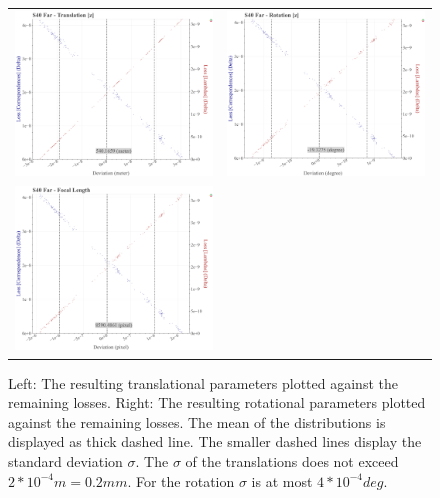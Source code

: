 \begin{figure}[t]
\begin{tabular}{cc}
    \includegraphics[width=0.45 \linewidth]{diagrams/calibration/s40_n_far/parameters.csv/Translation[z]_vs_Loss[Correspondences]_vs_Loss[Lambdas]_cluster_All.png} &
    \includegraphics[width=0.45 \linewidth]{diagrams/calibration/s40_n_far/parameters.csv/Rotation[z]_vs_Loss[Correspondences]_vs_Loss[Lambdas]_cluster_All.png} \\

    \includegraphics[width=0.45 \linewidth]{diagrams/calibration/s40_n_far/parameters.csv/FocalLength_vs_Loss[Correspondences]_vs_Loss[Lambdas]_cluster_All.png} \\
\end{tabular}
\caption{
  Left: The resulting translational parameters plotted against the remaining losses. 
  Right: The resulting rotational parameters plotted against the remaining losses.
  The mean of the distributions is displayed as thick dashed line. The smaller dashed lines display the standard deviation $\sigma$.
  The $\sigma$ of the translations does not exceed $2 * 10^{-4} m = 0.2 mm$.
  For the rotation $\sigma$ is at most $4 * 10^{-4} deg$.
  }
\label{fig:static_calibration_algorithmic_error}
\end{figure}

